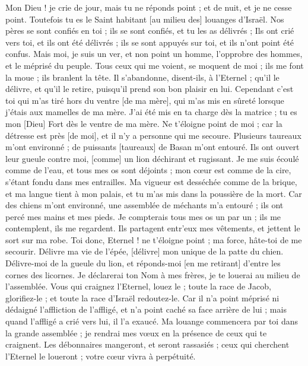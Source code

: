 \begin{multicols}{2}
Mon Dieu ! je crie de jour, mais tu ne réponds point ; et de nuit, et je ne cesse point.
Toutefois tu es le Saint habitant [au milieu des] louanges d'Israël.
Nos pères se sont confiés en toi ; ils se sont confiés, et tu les as délivrés ;
Ils ont crié vers toi, et ils ont été délivrés ; ils se sont appuyés sur toi, et ils n'ont point été confus.
Mais moi, je suis un ver, et non point un homme, l'opprobre des hommes, et le méprisé du peuple.
Tous ceux qui me voient, se moquent de moi ; ils me font la moue ; ils branlent la tête.
Il s'abandonne, disent-ils, à l'Eternel ; qu'il le délivre, et qu'il le retire, puisqu'il prend son bon plaisir en lui.
Cependant c'est toi qui m'as tiré hors du ventre [de ma mère], qui m'as mis en sûreté lorsque j'étais aux mamelles de ma mère.
J'ai été mis en ta charge dès la matrice ; tu es mon [Dieu] Fort dès le ventre de ma mère.
Ne t'éloigne point de moi ; car la détresse est près [de moi], et il n'y a personne qui me secoure.
Plusieurs taureaux m'ont environné ; de puissants [taureaux] de Basan m'ont entouré.
Ils ont ouvert leur gueule contre moi, [comme] un lion déchirant et rugissant.
Je me suis écoulé comme de l'eau, et tous mes os sont déjoints ; mon cœur est comme de la cire, s'étant fondu dans mes entrailles.
Ma vigueur est desséchée comme de la brique, et ma langue tient à mon palais, et tu m'as mis dans la poussière de la mort.
Car des chiens m'ont environné, une assemblée de méchants m'a entouré ; ils ont percé mes mains et mes pieds.
Je compterais tous mes os un par un ; ils me contemplent, ils me regardent.
Ils partagent entr’eux mes vêtements, et jettent le sort sur ma robe.
Toi donc, Eternel ! ne t'éloigne point ; ma force, hâte-toi de me secourir.
Délivre ma vie de l'épée, [délivre] mon unique de la patte du chien.
Délivre-moi de la gueule du lion, et réponds-moi [en me retirant] d'entre les cornes des licornes.
Je déclarerai ton Nom à mes frères, je te louerai au milieu de l'assemblée.
Vous qui craignez l'Eternel, louez le ; toute la race de Jacob, glorifiez-le ; et toute la race d'Israël redoutez-le.
Car il n'a point méprisé ni dédaigné l'affliction de l'affligé, et n'a point caché sa face arrière de lui ; mais quand l'affligé a crié vers lui, il l'a exaucé.
Ma louange commencera par toi dans la grande assemblée ; je rendrai mes vœux en la présence de ceux qui te craignent.
Les débonnaires mangeront, et seront rassasiés ; ceux qui cherchent l'Eternel le loueront ; votre cœur vivra à perpétuité.

\end{multicols}
